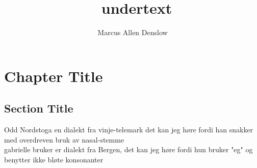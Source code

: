 \documentclass{report}
\title{\Huge{}\ undertext}
\author{\Huge{Marcus Allen Denslow}}
\date{}
\begin{document}
\maketitle
\newpage%
\tableofcontents
\pagebreak

\chapter{Chapter Title}
\section{Section Title}
Odd Nordstoga en dialekt fra vinje-telemark det kan jeg høre fordi han snakker med overdreven bruk av nasal-stemme
\\
gabrielle bruker er dialekt fra Bergen, det kan jeg høre fordi hun bruker "eg" og benytter ikke bløte konsonanter
\end{document}
